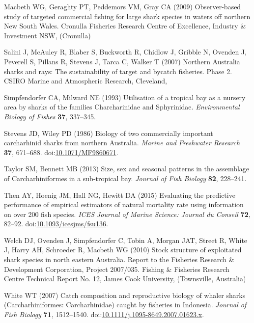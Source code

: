\documentclass[]{article}
\begin{document}
\leavevmode\hypertarget{ref-macbeth_observer-based_2009}{}%
Macbeth WG, Geraghty PT, Peddemors VM, Gray CA (2009) Observer-based
study of targeted commercial fishing for large shark species in waters
off northern New South Wales. Cronulla Fisheries Research Centre of
Excellence, Industry \& Investment NSW, (Cronulla)

\leavevmode\hypertarget{ref-salini_northern_2007}{}%
Salini J, McAuley R, Blaber S, Buckworth R, Chidlow J, Gribble N,
Ovenden J, Peverell S, Pillans R, Stevens J, Tarca C, Walker T (2007)
Northern Australia sharks and rays: The sustainability of target and
bycatch fisheries. Phase 2. CSIRO Marine and Atmospheric Research,
Cleveland,

\leavevmode\hypertarget{ref-simpfendorfer_utilisation_1993}{}%
Simpfendorfer CA, Milward NE (1993) Utilisation of a tropical bay as a
nursery area by sharks of the families Charcharinidae and Sphyrinidae.
\emph{Environmental Biology of Fishes} \textbf{37}, 337--345.

\leavevmode\hypertarget{ref-stevens_biology_1986}{}%
Stevens JD, Wiley PD (1986) Biology of two commercially important
carcharhinid sharks from northern Australia. \emph{Marine and Freshwater
Research} \textbf{37}, 671--688.
doi:\href{https://doi.org/10.1071/MF9860671}{10.1071/MF9860671}.

\leavevmode\hypertarget{ref-taylor_size_2013}{}%
Taylor SM, Bennett MB (2013) Size, sex and seasonal patterns in the
assemblage of Carcharhiniformes in a sub-tropical bay. \emph{Journal of
Fish Biology} \textbf{82}, 228--241.

\leavevmode\hypertarget{ref-then_evaluating_2015}{}%
Then AY, Hoenig JM, Hall NG, Hewitt DA (2015) Evaluating the predictive
performance of empirical estimators of natural mortality rate using
information on over 200 fish species. \emph{ICES Journal of Marine
Science: Journal du Conseil} \textbf{72}, 82--92.
doi:\href{https://doi.org/10.1093/icesjms/fsu136}{10.1093/icesjms/fsu136}.

\leavevmode\hypertarget{ref-welch_stock_2010}{}%
Welch DJ, Ovenden J, Simpfendorfer C, Tobin A, Morgan JAT, Street R,
White J, Harry AH, Schroeder R, Macbeth WG (2010) Stock structure of
exploitated shark species in north eastern Australia. Report to the
Fisheries Research \& Development Corporation, Project 2007/035. Fishing
\& Fisheries Research Centre Technical Report No. 12, James Cook
University, (Townsville, Australia)

\leavevmode\hypertarget{ref-white_catch_2007}{}%
White WT (2007) Catch composition and reproductive biology of whaler
sharks (Carcharhiniformes: Carcharhinidae) caught by fisheries in
Indonesia. \emph{Journal of Fish Biology} \textbf{71}, 1512--1540.
doi:\href{https://doi.org/10.1111/j.1095-8649.2007.01623.x}{10.1111/j.1095-8649.2007.01623.x}.
\end{document}
